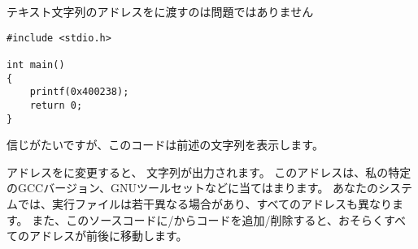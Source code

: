 テキスト文字列のアドレスをに渡すのは問題ではありません

\begin{lstlisting}[style=customc]
#include <stdio.h>

int main()
{
    printf(0x400238);
    return 0;
}
\end{lstlisting}

信じがたいですが、このコードは前述の文字列を表示します。

アドレスをに変更すると、 文字列が出力されます。 
このアドレスは、私の特定のGCCバージョン、GNUツールセットなどに当てはまります。
あなたのシステムでは、実行ファイルは若干異なる場合があり、すべてのアドレスも異なります。 
また、このソースコードに/からコードを追加/削除すると、おそらくすべてのアドレスが前後に移動します。
